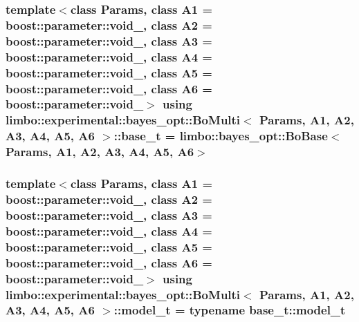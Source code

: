 \subsubsection[{\texorpdfstring{base\+\_\+t}{base_t}}]{\setlength{\rightskip}{0pt plus 5cm}template$<$class Params, class A1 = boost\+::parameter\+::void\+\_\+, class A2 = boost\+::parameter\+::void\+\_\+, class A3 = boost\+::parameter\+::void\+\_\+, class A4 = boost\+::parameter\+::void\+\_\+, class A5 = boost\+::parameter\+::void\+\_\+, class A6 = boost\+::parameter\+::void\+\_\+$>$ using {\bf limbo\+::experimental\+::bayes\+\_\+opt\+::\+Bo\+Multi}$<$ Params, A1, A2, A3, A4, A5, A6 $>$\+::{\bf base\+\_\+t} =  {\bf limbo\+::bayes\+\_\+opt\+::\+Bo\+Base}$<$Params, A1, A2, A3, A4, A5, A6$>$}\hypertarget{classlimbo_1_1experimental_1_1bayes__opt_1_1_bo_multi_a96e3df5190731faf8d60b20d6810ba64}{}\label{classlimbo_1_1experimental_1_1bayes__opt_1_1_bo_multi_a96e3df5190731faf8d60b20d6810ba64}
\subsubsection[{\texorpdfstring{model\+\_\+t}{model_t}}]{\setlength{\rightskip}{0pt plus 5cm}template$<$class Params, class A1 = boost\+::parameter\+::void\+\_\+, class A2 = boost\+::parameter\+::void\+\_\+, class A3 = boost\+::parameter\+::void\+\_\+, class A4 = boost\+::parameter\+::void\+\_\+, class A5 = boost\+::parameter\+::void\+\_\+, class A6 = boost\+::parameter\+::void\+\_\+$>$ using {\bf limbo\+::experimental\+::bayes\+\_\+opt\+::\+Bo\+Multi}$<$ Params, A1, A2, A3, A4, A5, A6 $>$\+::{\bf model\+\_\+t} =  typename {\bf base\+\_\+t\+::model\+\_\+t}}\hypertarget{classlimbo_1_1experimental_1_1bayes__opt_1_1_bo_multi_abc4fa6ff00e1bf591283e5a2739fb6c8}{}\label{classlimbo_1_1experimental_1_1bayes__opt_1_1_bo_multi_abc4fa6ff00e1bf591283e5a2739fb6c8}
